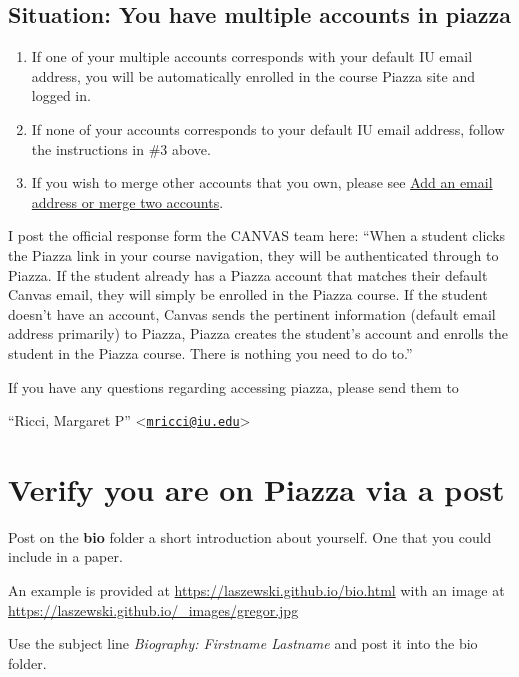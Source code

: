 \subsection*{Situation: You have multiple accounts in piazza}

\begin{enumerate}
\tightlist
\item
  If one of your multiple accounts corresponds with your default IU
  email address, you will be automatically enrolled in the course Piazza
  site and logged in.
\item
  If none of your accounts corresponds to your default IU email address,
  follow the instructions in \#3 above.
\item
  If you wish to merge other accounts that you own, please see
  \href{https://www.google.com/url?q=http://support.piazza.com/customer/portal/articles/1646661-add-an-email-address-or-merge-two-accounts\&sa=D\&ust=1502127148504000\&usg=AFQjCNHwO1kks2cnVLpWWCnOIEDFhl2fJA}{Add
  an email address or merge two accounts}.
\end{enumerate}

I post the official response form the CANVAS team here:
``When a student clicks the Piazza link in your course navigation, they
will be authenticated through to Piazza. If the student already has a
Piazza account that matches their default Canvas email, they will simply
be enrolled in the Piazza course. If the student doesn't have an
account, Canvas sends the pertinent information (default email address
primarily) to Piazza, Piazza creates the student's account and enrolls
the student in the Piazza course. There is nothing you need to do to.''

If you have any questions regarding accessing piazza, please send them
to

``Ricci, Margaret P''
\textless{}\href{mailto:mricci@iu.edu}{\nolinkurl{mricci@iu.edu}}\textgreater{}

\section{Verify you are on Piazza via a post}

Post on the \textbf{bio} folder a short introduction about yourself. One
that you could include in a paper.

An example is provided at \url{https://laszewski.github.io/bio.html}
with an image at \url{https://laszewski.github.io/_images/gregor.jpg}

Use the subject line \emph{Biography: Firstname Lastname} and post it
into the bio folder.

